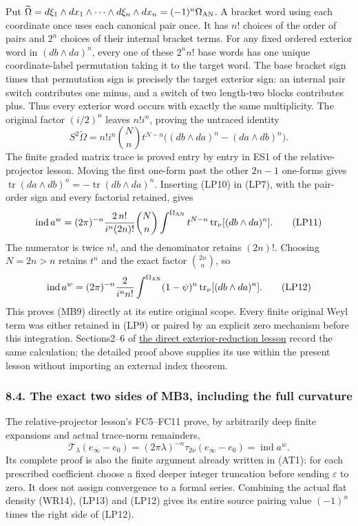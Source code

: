 \documentclass[
  11pt,
]{article}
\begin{document}
Put
\(\widetilde\Omega=d\xi_1\wedge dx_1\wedge\cdots\wedge d\xi_n\wedge dx_n=(-1)^n\Omega_{\rm AN}\).
A bracket word using each coordinate once uses each canonical pair once.
It has \(n!\) choices of the order of pairs and \(2^n\) choices of their
internal bracket terms. For any fixed ordered exterior word in
\((db\wedge da)^n\), every one of these \(2^n n!\) base words has one
unique coordinate-label permutation taking it to the target word. The
base bracket sign times that permutation sign is precisely the target
exterior sign: an internal pair switch contributes one minus, and a
switch of two length-two blocks contributes plus. Thus every exterior
word occurs with exactly the same multiplicity. The original factor
\((i/2)^n\) leaves \(n!i^n\), proving the untraced identity \[
 S^2\widetilde\Omega=n!i^n\binom Nn t^{N-n}
       \bigl((db\wedge da)^n-(da\wedge db)^n\bigr).
 \tag{LP10}
\] The finite graded matrix trace is proved entry by entry in ES1 of the
relative-projector lesson. Moving the first one-form past the other
\(2n-1\) one-forms gives
\(\operatorname{tr}(da\wedge db)^n=-\operatorname{tr}(db\wedge da)^n\).
Inserting (LP10) in (LP7), with the pair-order sign and every factorial
retained, gives \[
 \operatorname{ind}a^w=(2\pi)^{-n}
     {2\,n!\over i^n(2n)!}\binom Nn
       \int^{\Omega_{\rm AN}}t^{N-n}
                           \operatorname{tr}_\nu[(db\wedge da)^n].
 \tag{LP11}
\] The numerator is twice \(n!\), and the denominator retains \((2n)!\).
Choosing \(N=2n>n\) retains \(t^n\) and the exact factor
\(\binom{2n}{n}\), so \[
 \operatorname{ind}a^w=(2\pi)^{-n}{2\over i^n n!}
       \int^{\Omega_{\rm AN}}(1-\psi)^n
                           \operatorname{tr}_\nu[(db\wedge da)^n].
 \tag{LP12}
\] This proves (MB9) directly at its entire original scope. Every finite
original Weyl term was either retained in (LP9) or paired by an explicit
zero mechanism before this integration. Sections2--6 of
\href{ordered-weyl-exterior-reduction.pdf}{the direct exterior-reduction
lesson} record the same calculation; the detailed proof above supplies
its use within the present lesson without importing an external index
theorem.

\subsubsection{8.4. The exact two sides of MB3, including the full
curvature}\label{the-exact-two-sides-of-mb3-including-the-full-curvature}

The relative-projector lesson's FC5--FC11 prove, by arbitrarily deep
finite expansions and actual trace-norm remainders, \[
 \mathcal T_\lambda(e_\infty-e_0)
       =(2\pi\lambda)^{-n}\tau_{2\nu}(e_\infty-e_0)
       =\operatorname{ind}a^w.
 \tag{LP13}
\] Its complete proof is also the finite argument already written in
(AT1): for each prescribed coefficient choose a fixed deeper integer
truncation before sending \(\varepsilon\) to zero. It does not assign
convergence to a formal series. Combining the actual flat density
(WR14), (LP13) and (LP12) gives its entire source pairing value
\((-1)^n\) times the right side of (LP12).
\end{document}
